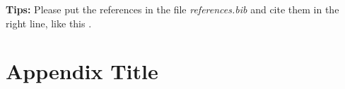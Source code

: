 \documentclass{article}
\begin{document}
    
 
 \textbf{Tips:} Please put the references in the file \emph{references.bib} and cite them in the right line, like this \cite{hadash2018estimate}.

\appendix
\section{Appendix Title}
\label{app:f18-runningtime}



\label{app:f23-runningtime}



  
  
\end{document}

